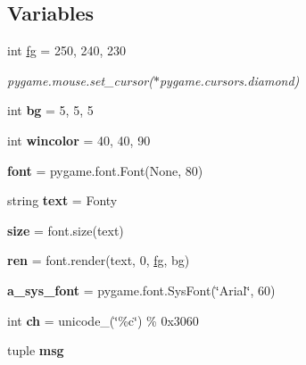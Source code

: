 \subsection*{Variables}
\begin{DoxyCompactItemize}
\item 
\mbox{\label{namespacepygame_1_1examples_1_1fonty_a961d7f80a684ef6e9554741c5c93e0dc}} 
int \hyperlink{namespacepygame_1_1examples_1_1fonty_a961d7f80a684ef6e9554741c5c93e0dc}{fg} = 250, 240, 230
\begin{DoxyCompactList}\small\item\em pygame.\+mouse.\+set\+\_\+cursor($\ast$pygame.cursors.\+diamond) \end{DoxyCompactList}\item 
\mbox{\label{namespacepygame_1_1examples_1_1fonty_afd331fbd898e20d909e8655f81104aa2}} 
int {\bfseries bg} = 5, 5, 5
\item 
\mbox{\label{namespacepygame_1_1examples_1_1fonty_a25f169031d42ec6b69df1f3cf156ddb0}} 
int {\bfseries wincolor} = 40, 40, 90
\item 
\mbox{\label{namespacepygame_1_1examples_1_1fonty_a2b69f732fadd32de026a0b85f74bc8d3}} 
{\bfseries font} = pygame.\+font.\+Font(None, 80)
\item 
\mbox{\label{namespacepygame_1_1examples_1_1fonty_a75f64a643fe77b3d6bccdaf128421deb}} 
string {\bfseries text} = \textquotesingle{}Fonty\textquotesingle{}
\item 
\mbox{\label{namespacepygame_1_1examples_1_1fonty_a9c368b5b0921d50d1e41a2fe94e8607d}} 
{\bfseries size} = font.\+size(text)
\item 
\mbox{\label{namespacepygame_1_1examples_1_1fonty_a76d883ca3923581a75e3fe1aa547194d}} 
{\bfseries ren} = font.\+render(text, 0, \hyperlink{namespacepygame_1_1examples_1_1fonty_a961d7f80a684ef6e9554741c5c93e0dc}{fg}, bg)
\item 
\mbox{\label{namespacepygame_1_1examples_1_1fonty_a233771208acfea445c554d217d7a28c4}} 
{\bfseries a\+\_\+sys\+\_\+font} = pygame.\+font.\+Sys\+Font(\char`\"{}Arial\char`\"{}, 60)
\item 
\mbox{\label{namespacepygame_1_1examples_1_1fonty_a09330bd399a372c9680a50acc79b8657}} 
int {\bfseries ch} = unicode\+\_\+(\char`\"{}\%c\char`\"{}) \% 0x3060
\item 
tuple {\bfseries msg}
\end{DoxyCompactItemize}


